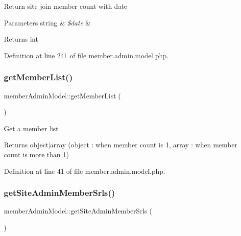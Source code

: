 Return site join member count with date


\begin{DoxyParams}[1]{Parameters}
string & {\em \$date} & \\
\hline
\end{DoxyParams}
\begin{DoxyReturn}{Returns}
int 
\end{DoxyReturn}


Definition at line 241 of file member.\+admin.\+model.\+php.

\mbox{\label{classmemberAdminModel_add5844ac2ed9170897363464c759f94f}} 
\subsubsection{\texorpdfstring{get\+Member\+List()}{getMemberList()}}
{\footnotesize\ttfamily member\+Admin\+Model\+::get\+Member\+List (\begin{DoxyParamCaption}{ }\end{DoxyParamCaption})}

Get a member list

\begin{DoxyReturn}{Returns}
object$\vert$array (object \+: when member count is 1, array \+: when member count is more than 1) 
\end{DoxyReturn}


Definition at line 41 of file member.\+admin.\+model.\+php.

\mbox{\label{classmemberAdminModel_a2ae855f2db9aa8c5fc821a2de9d766e9}} 
\subsubsection{\texorpdfstring{get\+Site\+Admin\+Member\+Srls()}{getSiteAdminMemberSrls()}}
{\footnotesize\ttfamily member\+Admin\+Model\+::get\+Site\+Admin\+Member\+Srls (\begin{DoxyParamCaption}{ }\end{DoxyParamCaption})}

